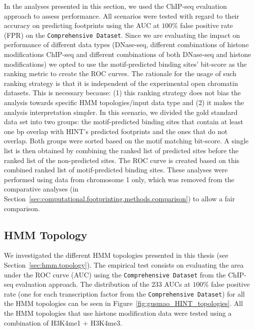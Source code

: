 In the analyses presented in this section, we used the ChIP-seq evaluation approach to assess performance. All scenarios were tested with regard to their accuracy on predicting footprints using the AUC at $100\%$ false positive rate (FPR) on the {\tt Comprehensive Dataset}. Since we are evaluating the impact on performance of different data types (DNase-seq, different combinations of histone modifications ChIP-seq and different combinations of both DNase-seq and histone modifications) we opted to use the motif-predicted binding sites' bit-score as the ranking metric to create the ROC curves. The rationale for the usage of such ranking strategy is that it is independent of the experimental open chromatin datasets. This is necessary because: (1) this ranking strategy does not bias the analysis towards specific HMM topologies/input data type and (2) it makes the analysis interpretation simpler. In this scenario, we divided the gold standard data set into two groups: the motif-predicted binding sites that contain at least one bp overlap with HINT's predicted footprints and the ones that do not overlap. Both groups were sorted based on the motif matching bit-score. A single list is then obtained by combining the ranked list of predicted sites before the ranked list of the non-predicted sites. The ROC curve is created based on this combined ranked list of motif-predicted binding sites. These analyses were performed using data from chromosome 1 only, which was removed from the comparative analyses (in Section~\ref{sec:computational.footprinting.methods.comparison}) to allow a fair comparison.

\subsection{HMM Topology}
\label{sec:ps.hmm.topology}

We investigated the different HMM topologies presented in this thesis (see Section~\ref{sec:hmm.topology}). The empirical test consists on evaluating the area under the ROC curve (AUC) using the {\tt Comprehensive Dataset} from the ChIP-seq evaluation approach. The distribution of the $233$ AUCs at $100\%$ false positive rate (one for each transcription factor from the {\tt Comprehensive Dataset}) for all the HMM topologies can be seen in Figure~\ref{fig:gusmao_HINT_topologies}. All the HMM topologies that use histone modification data were tested using a combination of H3K4me1 $+$ H3K4me3.

